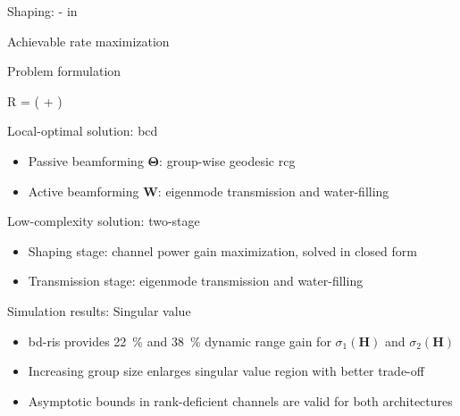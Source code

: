 \documentclass[presentation,xcolor={table},9pt]{beamer}
\begin{document}
\begin{section}{Shaping: - in }
	\begin{frame}{Achievable rate maximization}
		\begin{block}{Problem formulation}
			\begin{maxi*}
				{}{R = \log \det \biggl( + \biggr)}{}{}
			\end{maxi*}
		\end{block}
		\begin{exampleblock}{Local-optimal solution: \gls{bcd}}
			\begin{itemize}
				\item Passive beamforming $\mathbf{\Theta}$: group-wise geodesic \gls{rcg}
				\item Active beamforming $\mathbf{W}$: eigenmode transmission and water-filling
			\end{itemize}
		\end{exampleblock}
		\begin{exampleblock}{Low-complexity solution: two-stage}
			\begin{itemize}
				\item Shaping stage: channel power gain maximization, solved in closed form
				\item Transmission stage: eigenmode transmission and water-filling
			\end{itemize}
		\end{exampleblock}
	\end{frame}

	\begin{frame}{Simulation results: Singular value}
		\begin{figure}
			\centering
			\label{fg:singular_bound}
		\end{figure}
		\vspace{1em}
		\begin{itemize}
			\item \gls{bd}-\gls{ris} provides \qty{22}{\percent} and \qty{38}{\percent} dynamic range gain for $\sigma_1(\mathbf{H})$ and $\sigma_2(\mathbf{H})$
			\item Increasing group size enlarges singular value region with better trade-off
			\item Asymptotic bounds in rank-deficient channels are valid for both architectures
		\end{itemize}
	\end{frame}


\end{section}
\end{document}
